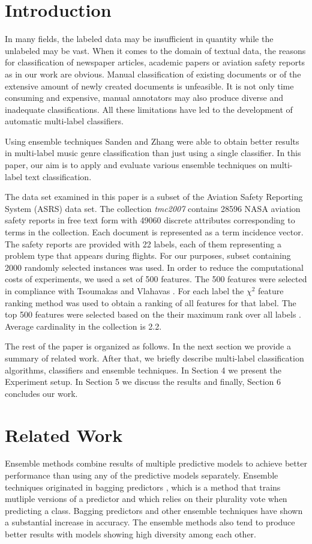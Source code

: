 \section{Introduction}
In many fields, the labeled data may be insufficient in quantity while the unlabeled may be vast. When it comes to the domain of textual data, the reasons for classification of newspaper articles, academic papers or aviation safety reports as in our work are obvious. Manual classification of existing documents or of the extensive amount of newly created documents is unfeasible. It is not only time consuming and expensive, manual annotators may also produce diverse and inadequate classifications. All these limitations have led to the development of automatic multi-label classifiers.

Using ensemble techniques Sanden and Zhang \cite{sanden2011enhancing} were able to obtain better results in multi-label music genre classification than just using a single classifier. In this paper, our aim is to apply and evaluate various ensemble techniques on multi-label text classification.

The data set examined in this paper is a subset of the Aviation Safety Reporting System (ASRS) data set. The collection \emph{tmc2007} contains 28596 NASA aviation safety reports in free text form with 49060 discrete attributes corresponding to terms in the collection. Each document is represented as a term incidence vector. The safety reports are provided with 22 labels, each of them representing a problem type that appears during flights. For our purposes, subset containing 2000 randomly selected instances was used. In order to reduce the computational costs of experiments, we used a set of 500 features. The 500 features were selected in compliance with Tsoumakas and Vlahavas \cite{TsoumakasVlahavas2007kLablesets}. For each label the $\chi^{2}$ feature ranking method was used to obtain a ranking of all features for that label. The top 500 features were selected based on the their maximum rank over all labels \cite{TsoumakasVlahavas2007kLablesets}. Average cardinality in the collection is 2.2.

The rest of the paper is organized as follows. In the next section we provide a summary of related work. After that, we briefly describe multi-label classification algorithms, classifiers and ensemble techniques. In Section 4 we present the Experiment setup. In Section 5 we discuss the results and finally, Section 6 concludes our work.

\section{Related Work}
Ensemble methods combine results of multiple predictive models to achieve better performance than using any of the predictive models separately. Ensemble techniques originated in bagging predictors \cite{breiman1996bagging}, which is a method that trains mutliple versions of a predictor and which relies on their plurality vote when predicting a class. Bagging predictors and other ensemble techniques \cite{sanden2011enhancing} have shown a substantial increase in accuracy. The ensemble methods also tend to produce better results with models showing high diversity among each other. 

